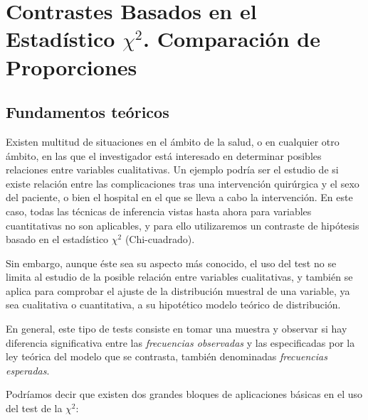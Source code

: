 
\chapter[Contrastes Basados en el Estadístico $\chi^{2}$]{Contrastes Basados en el Estadístico $\chi^{2}$. Comparación de Proporciones}

\section{Fundamentos teóricos}
Existen multitud de situaciones en el ámbito de la salud, o en cualquier otro ámbito, en las que el investigador está interesado en
determinar posibles relaciones entre variables cualitativas. Un ejemplo podría ser el estudio de si existe relación entre las complicaciones
tras una intervención quirúrgica y el sexo del paciente, o bien el hospital en el que se lleva a cabo la intervención. En este caso, todas
las técnicas de inferencia vistas hasta ahora para variables cuantitativas no son aplicables, y para ello utilizaremos un contraste de
hipótesis basado en el estadístico $\chi^{2}$ (Chi-cuadrado).

Sin embargo, aunque éste sea su aspecto más conocido, el uso del test no se limita al estudio de la posible relación entre variables
cualitativas, y también se aplica para comprobar el ajuste de la distribución muestral de una variable, ya sea cualitativa o cuantitativa, a
su hipotético modelo teórico de distribución.

En general, este tipo de tests consiste en tomar una muestra y observar si hay diferencia significativa entre las \emph{frecuencias
observadas} y las especificadas por la ley teórica del modelo que se contrasta, también denominadas \emph{frecuencias esperadas}.

Podríamos decir que existen dos grandes bloques de aplicaciones básicas en el uso del test de la $\chi^{2}$:


